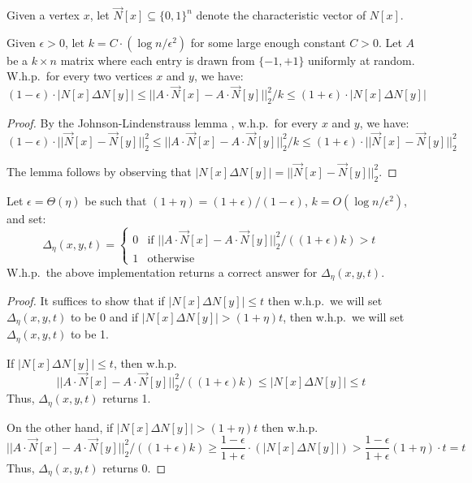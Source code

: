 \begin{definition} Given a vertex $x$, let $\vec{N}[x] \subseteq \{0,1\}^{n}$ denote the characteristic vector of $N[x]$. \end{definition}
\begin{lemma} Given $\epsilon > 0$, let $k = C \cdot (\log n / \epsilon^2)$ for some large enough constant $C>0$. Let $A$ be a $k \times n$ matrix where each entry is drawn from $\{-1, +1\}$ uniformly at random. W.h.p.~for every two vertices $x$ and $y$, we have:
$$ (1-\epsilon) \cdot |N[x] \Delta N[y] | \leq ||A \cdot \vec{N}[x] - A \cdot \vec{N}[y]||^2_{2}/k \leq (1+\epsilon) \cdot  |N[x] \Delta N[y] |$$
\end{lemma}
\begin{proof} By the Johnson-{L}indenstrauss lemma \cite{Achlioptas03,JL84}, w.h.p.~for every $x$ and $y$, we have: 
$$(1-\epsilon) \cdot ||\vec{N}[x] - \vec{N}[y]||^2_{2} \leq ||A \cdot \vec{N}[x] - A \cdot \vec{N}[y]||^2_{2}/k \leq (1+\epsilon) \cdot ||\vec{N}[x] - \vec{N}[y]||^2_{2}$$

The lemma follows by observing that $|N[x] \Delta N[y]| = ||\vec{N}[x] - \vec{N}[y]||^2_{2}$. 
\end{proof}

\begin{lemma}\label{lem:test}
Let $\epsilon = \Theta(\eta)$ be such that $(1+\eta) = (1+\epsilon)/(1-\epsilon)$, $k = O(\log n /\epsilon^2)$,  and set:
$$\Delta_{\eta}(x,y,t) = \begin{cases} 0 & \mbox{if $||A \cdot \vec{N}[x] - A \cdot \vec{N}[y]||^2_{2}/((1+\epsilon)k) > t$} \\
1 & \mbox{otherwise} \end{cases}$$
W.h.p.~the above implementation returns a correct answer for $\Delta_{\eta}(x,y,t)$.
\end{lemma}
\begin{proof}
It suffices to show that if $|N[x] \Delta N[y]| \leq t$ then w.h.p.~we will set $\Delta_{\eta}(x,y,t)$ to be $0$ and if $|N[x] \Delta N[y]| > (1+\eta)t$, then w.h.p.~we will set $\Delta_{\eta}(x,y,t)$ to be 1.

If $|N[x] \Delta N[y]| \leq t$, then w.h.p. $$||A \cdot \vec{N}[x] - A \cdot \vec{N}[y]||^2_{2}/((1+\epsilon)k) \leq |N[x] \Delta N[y]| \leq t$$
Thus, $\Delta_{\eta}(x,y,t)$ returns 1. 

On the other hand, if $|N[x] \Delta N[y]| > (1+\eta)t$ then w.h.p.
$$||A \cdot \vec{N}[x] - A \cdot \vec{N}[y]||^2_{2}/((1+\epsilon)k) \geq \frac{1-\epsilon}{1+\epsilon}\cdot (|N[x] \Delta N[y]|) > \frac{1-\epsilon}{1+\epsilon}(1+\eta) \cdot t = t$$
Thus, $\Delta_{\eta}(x,y,t)$ returns 0. 
\end{proof}

